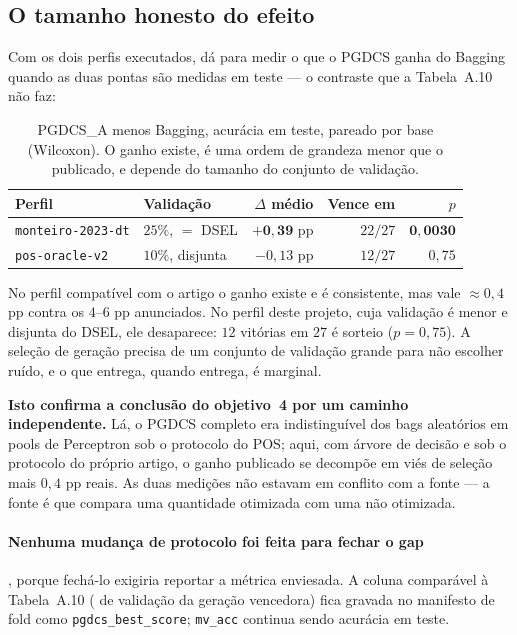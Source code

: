 \subsection{O tamanho honesto do efeito}

Com os dois perfis executados, dá para medir o que o PGDCS ganha do Bagging quando
as duas pontas são medidas em teste --- o contraste que a Tabela~A.10 não faz:

\begin{table}[htbp]
\centering\small
\caption{PGDCS\_A menos Bagging, acurácia \mvr{} em teste, pareado por base
(Wilcoxon). O ganho existe, é uma ordem de grandeza menor que o publicado, e
depende do tamanho do conjunto de validação.}
\begin{tabular}{llrrr}
\toprule
Perfil & Validação & $\Delta$ médio & Vence em & $p$ \\
\midrule
\texttt{monteiro-2023-dt} & $25\%$, $=$ DSEL & $\mathbf{+0{,}39}$ pp & $22/27$ & $\mathbf{0{,}0030}$ \\
\texttt{pos-oracle-v2} & $10\%$, disjunta & $-0{,}13$ pp & $12/27$ & $0{,}75$ \\
\bottomrule
\end{tabular}
\end{table}

No perfil compatível com o artigo o ganho existe e é consistente, mas vale
$\approx0{,}4$ pp contra os $4$--$6$ pp anunciados. No perfil deste projeto, cuja
validação é menor e disjunta do DSEL, ele desaparece: $12$ vitórias em $27$ é
sorteio ($p=0{,}75$). A seleção de geração precisa de um conjunto de validação
grande para não escolher ruído, e o que entrega, quando entrega, é marginal.

\textbf{Isto confirma a conclusão do objetivo~4 por um caminho independente.} Lá, o
PGDCS completo era indistinguível dos bags aleatórios em pools de Perceptron sob o
protocolo do POS; aqui, com árvore de decisão e sob o protocolo do próprio artigo,
o ganho publicado se decompõe em viés de seleção mais $0{,}4$ pp reais. As duas
medições não estavam em conflito com a fonte --- a fonte é que compara uma
quantidade otimizada com uma não otimizada.

\paragraph{Nenhuma mudança de protocolo foi feita para fechar o gap}, porque
fechá-lo exigiria reportar a métrica enviesada. A coluna comparável à Tabela~A.10
(\mvr{} de validação da geração vencedora) fica gravada no manifesto de fold como
\texttt{pgdcs\_best\_score}; \texttt{mv\_acc} continua sendo acurácia em teste.

